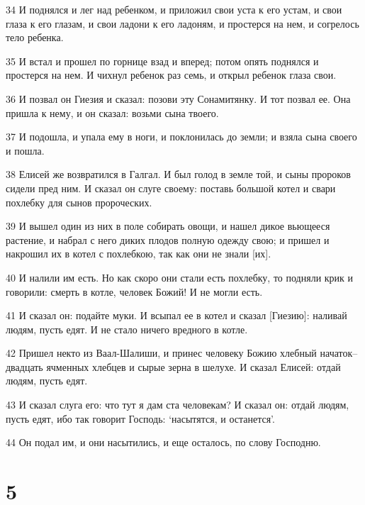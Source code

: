 \par 34 И поднялся и лег над ребенком, и приложил свои уста к его устам, и свои глаза к его глазам, и свои ладони к его ладоням, и простерся на нем, и согрелось тело ребенка.
\par 35 И встал и прошел по горнице взад и вперед; потом опять поднялся и простерся на нем. И чихнул ребенок раз семь, и открыл ребенок глаза свои.
\par 36 И позвал он Гиезия и сказал: позови эту Сонамитянку. И тот позвал ее. Она пришла к нему, и он сказал: возьми сына твоего.
\par 37 И подошла, и упала ему в ноги, и поклонилась до земли; и взяла сына своего и пошла.
\par 38 Елисей же возвратился в Галгал. И был голод в земле той, и сыны пророков сидели пред ним. И сказал он слуге своему: поставь большой котел и свари похлебку для сынов пророческих.
\par 39 И вышел один из них в поле собирать овощи, и нашел дикое вьющееся растение, и набрал с него диких плодов полную одежду свою; и пришел и накрошил их в котел с похлебкою, так как они не знали [их].
\par 40 И налили им есть. Но как скоро они стали есть похлебку, то подняли крик и говорили: смерть в котле, человек Божий! И не могли есть.
\par 41 И сказал он: подайте муки. И всыпал ее в котел и сказал [Гиезию]: наливай людям, пусть едят. И не стало ничего вредного в котле.
\par 42 Пришел некто из Ваал-Шалиши, и принес человеку Божию хлебный начаток--двадцать ячменных хлебцев и сырые зерна в шелухе. И сказал Елисей: отдай людям, пусть едят.
\par 43 И сказал слуга его: что тут я дам ста человекам? И сказал он: отдай людям, пусть едят, ибо так говорит Господь: `насытятся, и останется'.
\par 44 Он подал им, и они насытились, и еще осталось, по слову Господню.

\chapter{5}

